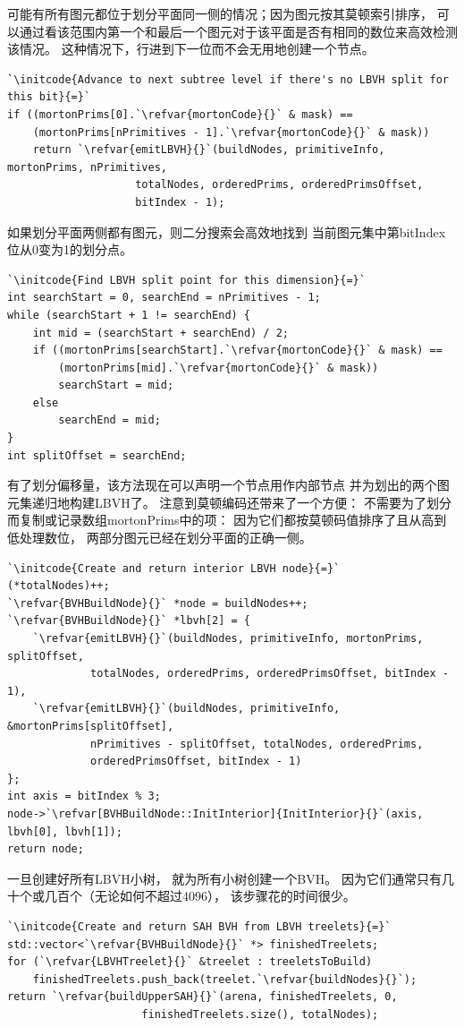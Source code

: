 可能有所有图元都位于划分平面同一侧的情况；因为图元按其莫顿索引排序，
可以通过看该范围内第一个和最后一个图元对于该平面是否有相同的数位来高效检测该情况。
这种情况下，行进到下一位而不会无用地创建一个节点。
\begin{lstlisting}
`\initcode{Advance to next subtree level if there's no LBVH split for this bit}{=}`
if ((mortonPrims[0].`\refvar{mortonCode}{}` & mask) ==
    (mortonPrims[nPrimitives - 1].`\refvar{mortonCode}{}` & mask))
    return `\refvar{emitLBVH}{}`(buildNodes, primitiveInfo, mortonPrims, nPrimitives,
                    totalNodes, orderedPrims, orderedPrimsOffset,
                    bitIndex - 1);
\end{lstlisting}

如果划分平面两侧都有图元，则二分搜索会高效地找到
当前图元集中第{\ttfamily bitIndex}位从0变为1的划分点。
\begin{lstlisting}
`\initcode{Find LBVH split point for this dimension}{=}`
int searchStart = 0, searchEnd = nPrimitives - 1;
while (searchStart + 1 != searchEnd) {
    int mid = (searchStart + searchEnd) / 2;
    if ((mortonPrims[searchStart].`\refvar{mortonCode}{}` & mask) ==
        (mortonPrims[mid].`\refvar{mortonCode}{}` & mask))
        searchStart = mid;
    else
        searchEnd = mid;
}
int splitOffset = searchEnd;
\end{lstlisting}

有了划分偏移量，该方法现在可以声明一个节点用作内部节点
并为划出的两个图元集递归地构建LBVH了。
注意到莫顿编码还带来了一个方便：
不需要为了划分而复制或记录数组{\ttfamily mortonPrims}中的项：
因为它们都按莫顿码值排序了且从高到低处理数位，
两部分图元已经在划分平面的正确一侧。
\begin{lstlisting}
`\initcode{Create and return interior LBVH node}{=}`
(*totalNodes)++;
`\refvar{BVHBuildNode}{}` *node = buildNodes++;
`\refvar{BVHBuildNode}{}` *lbvh[2] = {
    `\refvar{emitLBVH}{}`(buildNodes, primitiveInfo, mortonPrims, splitOffset,
             totalNodes, orderedPrims, orderedPrimsOffset, bitIndex - 1),
    `\refvar{emitLBVH}{}`(buildNodes, primitiveInfo, &mortonPrims[splitOffset],
             nPrimitives - splitOffset, totalNodes, orderedPrims,
             orderedPrimsOffset, bitIndex - 1)
};
int axis = bitIndex % 3;
node->`\refvar[BVHBuildNode::InitInterior]{InitInterior}{}`(axis, lbvh[0], lbvh[1]);
return node;
\end{lstlisting}

一旦创建好所有LBVH小树，
就为所有小树创建一个BVH。
因为它们通常只有几十个或几百个（无论如何不超过4096），
该步骤花的时间很少。
\begin{lstlisting}
`\initcode{Create and return SAH BVH from LBVH treelets}{=}`
std::vector<`\refvar{BVHBuildNode}{}` *> finishedTreelets;
for (`\refvar{LBVHTreelet}{}` &treelet : treeletsToBuild)
    finishedTreelets.push_back(treelet.`\refvar{buildNodes}{}`);
return `\refvar{buildUpperSAH}{}`(arena, finishedTreelets, 0,
                     finishedTreelets.size(), totalNodes);
\end{lstlisting}

